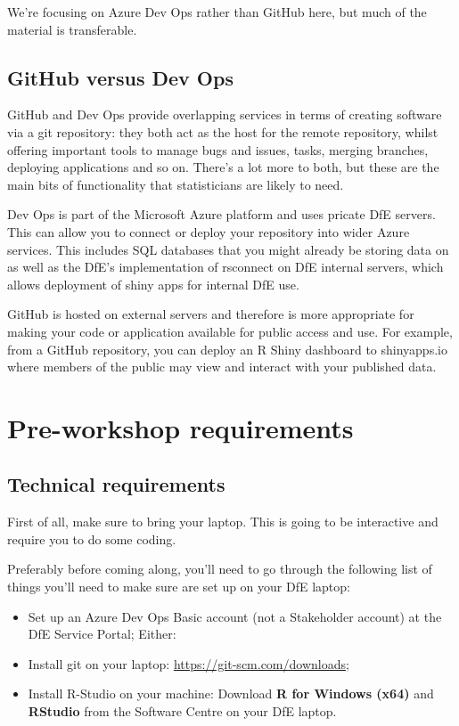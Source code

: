 \documentclass[
  12pt,
]{article}
\begin{document}
We're focusing on Azure Dev Ops rather than GitHub here, but much of the
material is transferable.

\hypertarget{github-versus-dev-ops}{%
\subsection{GitHub versus Dev Ops}\label{github-versus-dev-ops}}

GitHub and Dev Ops provide overlapping services in terms of creating
software via a git repository: they both act as the host for the remote
repository, whilst offering important tools to manage bugs and issues,
tasks, merging branches, deploying applications and so on. There's a lot
more to both, but these are the main bits of functionality that
statisticians are likely to need.

Dev Ops is part of the Microsoft Azure platform and uses pricate DfE
servers. This can allow you to connect or deploy your repository into
wider Azure services. This includes SQL databases that you might already
be storing data on as well as the DfE's implementation of rsconnect on
DfE internal servers, which allows deployment of shiny apps for internal
DfE use.

GitHub is hosted on external servers and therefore is more appropriate
for making your code or application available for public access and use.
For example, from a GitHub repository, you can deploy an R Shiny
dashboard to shinyapps.io where members of the public may view and
interact with your published data.

\hypertarget{pre-workshop-requirements}{%
\section{Pre-workshop requirements}\label{pre-workshop-requirements}}

\hypertarget{technical-requirements}{%
\subsection{Technical requirements}\label{technical-requirements}}

First of all, make sure to bring your laptop. This is going to be
interactive and require you to do some coding.

Preferably before coming along, you'll need to go through the following
list of things you'll need to make sure are set up on your DfE laptop:

\begin{itemize}
\item
  Set up an Azure Dev Ops Basic account (not a Stakeholder account) at
  the DfE Service Portal; Either:
\item
  Install git on your laptop: \url{https://git-scm.com/downloads};
\item
  Install R-Studio on your machine: Download \textbf{R for Windows
  (x64)} and \textbf{RStudio} from the Software Centre on your DfE
  laptop.
\end{itemize}
\end{document}
